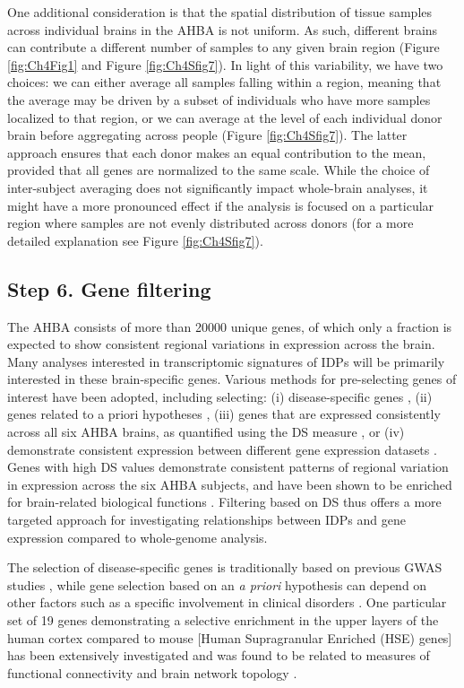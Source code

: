 One additional consideration is that the spatial distribution of tissue samples across individual brains in the AHBA is not uniform. As such, different brains can contribute a different number of samples to any given brain region (Figure \ref{fig:Ch4Fig1} and Figure \ref{fig:Ch4Sfig7}). In light of this variability, we have two choices: we can either average all samples falling within a region, meaning that the average may be driven by a subset of individuals who have more samples localized to that region, or we can average at the level of each individual donor brain before aggregating across people (Figure \ref{fig:Ch4Sfig7}). The latter approach ensures that each donor makes an equal contribution to the mean, provided that all genes are normalized to the same scale. While the choice of inter-subject averaging does not significantly impact whole-brain analyses, it might have a more pronounced effect if the analysis is focused on a particular region where samples are not evenly distributed across donors (for a more detailed explanation see Figure \ref{fig:Ch4Sfig7}).

\subsection{Step 6. Gene filtering}

The AHBA consists of more than \num{20000} unique genes, of which only a fraction is expected to show consistent regional variations in expression across the brain. Many analyses interested in transcriptomic signatures of IDPs will be primarily interested in these brain-specific genes. Various methods for pre-selecting genes of interest have been adopted, including selecting: (i) disease-specific genes \citep{Rittman2016,Romme2017,Yokoyama2017a}, (ii) genes related to a priori hypotheses \citep{Goyal2014,Komorowski2016,Krienen2016,Acevedo-Triana2017}, (iii) genes that are expressed consistently across all six AHBA brains, as quantified using the DS measure \citep{Hawrylycz2015}, or (iv) demonstrate consistent expression between different gene expression datasets \citep{Shin2017}. Genes with high DS values demonstrate consistent patterns of regional variation in expression across the six AHBA subjects, and have been shown to be enriched for brain-related biological functions \citep{Hawrylycz2015}. Filtering based on DS thus offers a more targeted approach for investigating relationships between IDPs and gene expression compared to whole-genome analysis.

The selection of disease-specific genes is traditionally based on previous GWAS studies \citep{Satake2009,Simon-Sanchez2009,Hoglinger2011,Ferrari2014,Ripke2014a,Kouri2015}, while gene selection based on an \textit{a priori} hypothesis can depend on other factors such as a specific involvement in clinical disorders \citep{Komorowski2016,Acevedo-Triana2017}. One particular set of 19 genes demonstrating a selective enrichment in the upper layers of the human cortex compared to mouse [Human Supragranular Enriched (HSE) genes] has been extensively investigated and was found to be related to measures of functional connectivity \citep{Krienen2016} and brain network topology \citep{Vertes2016b,Romero-Garcia2018}.

